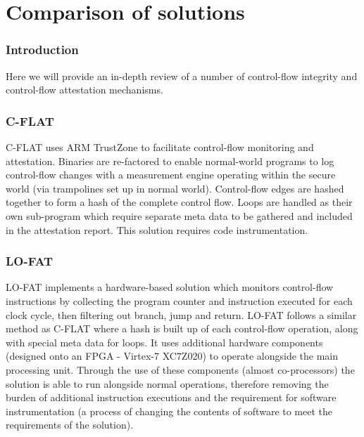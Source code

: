 \section{Comparison of solutions} \label{comparisonOfCFISolutions}

\subsubsection{Introduction}

Here we will provide an in-depth review of a number of control-flow integrity and control-flow attestation mechanisms.

\subsubsection{C-FLAT}
C-FLAT \cite{Abera2016} uses ARM TrustZone to facilitate control-flow monitoring and attestation. Binaries are re-factored to enable normal-world programs to log control-flow changes with a measurement engine operating within the secure world (via trampolines set up in normal world). Control-flow edges are hashed together to form a hash of the complete control flow. Loops are handled as their own sub-program which require separate meta data to be gathered and included in the attestation report. This solution requires code instrumentation.

\subsubsection{LO-FAT}
LO-FAT \cite{Abera2016} implements a hardware-based solution which monitors control-flow instructions by collecting the program counter and instruction executed for each clock cycle, then filtering out branch, jump and return. LO-FAT follows a similar method as C-FLAT where a hash is built up of each control-flow operation, along with special meta data for loops. It uses additional hardware components (designed onto an FPGA - Virtex-7 XC7Z020) to operate alongside the main processing unit. Through the use of these components (almost co-processors) the solution is able to run alongside normal operations, therefore removing the burden of additional instruction executions and the requirement for software instrumentation (a process of changing the contents of software to meet the requirements of the solution).

